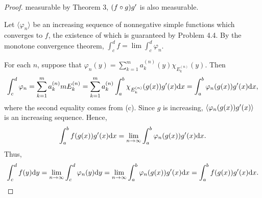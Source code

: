 \begin{proof}
    measurable by Theorem 3, $(f\circ g)g^\prime$ is also measurable. \par
    Let $\langle\varphi_n\rangle$ be an increasing sequence of nonnegative
    simple functions which converges to $f$, the existence of which is 
    guaranteed by Problem 4.4. By the monotone convergence theorem, $\int_c^d f
    =\lim\int_c^d\varphi_n$.\par
    For each $n$, suppose that $\varphi_n(y)=\sum_{k=1}^ma_k^{(n)}(y)
    \chi_{E_k^{(n)}}(y)$. Then
    \[
      \int_c^d\varphi_n = \sum_{k=1}^ma_k^{(n)}mE_{k}^{(n)}=
      \sum_{k=1}^ma_k^{(n)}\int_a^b\chi_{E_k^{(n)}}(g(x))g^\prime(x)\mathrm{d} x=
      \int_a^b\varphi_n(g(x))g^\prime(x)\mathrm{d} x,
    \]
    where the second equality comes from (c). Since $g$ is increasing, 
    $\langle\varphi_n(g(x))g^\prime(x)\rangle$ is an increasing sequence. Hence,
    \[
      \int_a^b f(g(x))g^\prime(x)\mathrm{d} x =
      \lim_{n\to\infty}\int_a^b\varphi_n(g(x))g^\prime(x)\mathrm{d} x.
    \]
    Thus,
    \[
      \int_c^d f(y)\mathrm{d} y = 
      \lim_{n\to\infty}\int_c^d\varphi_n(y)\mathrm{d} y =
      \lim_{n\to\infty}\int_a^b\varphi_n(g(x))g^\prime(x)\mathrm{d} x =
      \int_a^b f(g(x))g^\prime(x)\mathrm{d} x.
    \]
  \end{proof}


